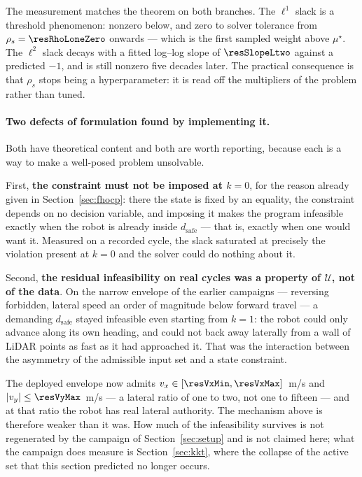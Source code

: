 \documentclass[11pt,a4paper]{article}
\newcommand{\dsafe}{d_{\mathrm{safe}}}
\begin{document}
The measurement matches the theorem on both branches. The $\ell^1$ slack is a threshold phenomenon: nonzero
below, and zero to solver tolerance from $\rho_s=\resRhoLoneZero$ onwards --- which is the first sampled weight
above $\mu^\star$. The $\ell^2$ slack decays with a fitted log--log slope of $\resSlopeLtwo$ against a
predicted $-1$, and is still nonzero five decades later. The practical consequence is that $\rho_s$ stops being
a hyperparameter: it is read off the multipliers of the problem rather than tuned.

\paragraph{Two defects of formulation found by implementing it.} Both have theoretical content and both are
worth reporting, because each is a way to make a well-posed problem unsolvable.

First, \textbf{the constraint must not be imposed at $k=0$}, for the reason already given in
Section~\ref{sec:fhocp}: there the state is fixed by an equality, the constraint depends on no decision
variable, and imposing it makes the program infeasible exactly when the robot is already inside $\dsafe$ ---
that is, exactly when one would want it. Measured on a recorded cycle, the slack saturated at precisely the
violation present at $k=0$ and the solver could do nothing about it.

Second, \textbf{the residual infeasibility on real cycles was a property of $\mathcal{U}$, not of the
data}. On the narrow envelope of the earlier campaigns --- reversing forbidden, lateral speed an order of
magnitude below forward travel --- a demanding $\dsafe$ stayed infeasible even starting from $k=1$: the
robot could only advance along its own heading, and could not back away laterally from a wall of LiDAR
points as fast as it had approached it. That was the interaction between the asymmetry of the admissible
input set and a state constraint.

The deployed envelope now admits $v_x\in[\resVxMin,\resVxMax]$~m/s and $|v_y|\le\resVyMax$~m/s --- a lateral
ratio of one to two, not one to fifteen --- and at that ratio the robot has real lateral authority. The
mechanism above is therefore weaker than it was. How much of the infeasibility survives is not regenerated
by the campaign of Section~\ref{sec:setup} and is not claimed here; what the campaign does measure is
Section~\ref{sec:kkt}, where the collapse of the active set that this section predicted no longer occurs.
\end{document}
